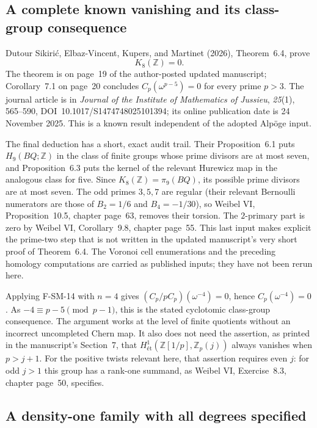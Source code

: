 \documentclass[11pt,a4paper]{article}
\theoremstyle{definition}\newtheorem{definition}[theorem]{Definition}
\theoremstyle{remark}\newtheorem{remark}[theorem]{Remark}
\begin{document}
\subsection{A complete known vanishing and its class-group consequence}

Dutour Sikiri\'c, Elbaz-Vincent, Kupers, and Martinet (2026),
Theorem~6.4, prove
\[
 K_8(\mathbb Z)=0.
\]
The theorem is on page~19 of the author-posted updated manuscript;
Corollary~7.1 on page~20 concludes
$C_p(\omega^{p-5})=0$ for every prime $p>3$.  The journal article is in
\emph{Journal of the Institute of Mathematics of Jussieu},
\emph{25}(1), 565--590, DOI~10.1017/S1474748025101394;
its online publication date is 24 November 2025.  This is a known result
independent of the adopted Alp\"oge input.

The final deduction has a short, exact audit trail.  Their
Proposition~6.1 puts $H_9(BQ;\mathbb Z)$ in the class of finite groups
whose prime divisors are at most seven, and Proposition~6.3 puts the
kernel of the relevant Hurewicz map in the analogous class for five.
Since $K_8(\mathbb Z)=\pi_9(BQ)$, its possible prime divisors are at
most seven.  The odd primes $3,5,7$ are regular (their relevant Bernoulli
numerators are those of $B_2=1/6$ and $B_4=-1/30$), so Weibel VI,
Proposition~10.5, chapter page~63, removes their torsion.  The
$2$-primary part is zero by Weibel VI, Corollary~9.8, chapter page~55.
This last input makes explicit the prime-two step that is not written in
the updated manuscript's very short proof of Theorem~6.4.  The Voronoi
cell enumerations and the preceding homology computations are carried
as published inputs; they have not been rerun here.

Applying F-SM-14 with $n=4$ gives
$(C_p/pC_p)(\omega^{-4})=0$, hence
$C_p(\omega^{-4})=0$.  As $-4\equiv p-5\pmod{p-1}$, this is the stated
cyclotomic class-group consequence.  The argument works at the level of
finite quotients without an incorrect uncompleted Chern map.  It also
does not need the assertion, as printed in the manuscript's Section~7,
that $H^1_{\text{ét}}(\mathbb Z[1/p],\mathbb Z_p(j))$
always vanishes when $p>j+1$.  For the positive twists relevant here,
that assertion requires even $j$: for odd $j>1$ this group has a
rank-one summand, as
Weibel VI, Exercise~8.3, chapter page~50, specifies.

\subsection{A density-one family with all degrees specified}
\end{document}
